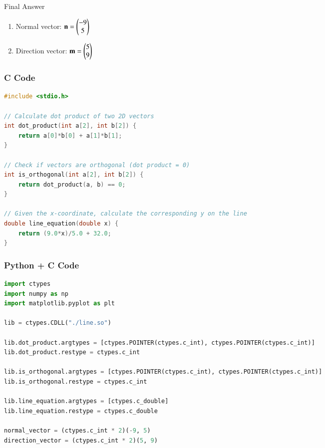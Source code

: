 \documentclass{beamer}
\begin{document}
\begin{frame}{Final Answer}
\begin{enumerate}
    \item Normal vector: $\mathbf{n} = \begin{pmatrix}-9 \\ 5\end{pmatrix}$
    \item Direction vector: $\mathbf{m} = \begin{pmatrix}5 \\ 9\end{pmatrix}$
\end{enumerate}
\end{frame}

\begin{frame}[fragile]
    \frametitle{C Code }

    \begin{lstlisting}[language=C]
#include <stdio.h>

// Calculate dot product of two 2D vectors
int dot_product(int a[2], int b[2]) {
    return a[0]*b[0] + a[1]*b[1];
}

// Check if vectors are orthogonal (dot product = 0)
int is_orthogonal(int a[2], int b[2]) {
    return dot_product(a, b) == 0;
}

// Given the x-coordinate, calculate the corresponding y on the line
double line_equation(double x) {
    return (9.0*x)/5.0 + 32.0;
}
    \end{lstlisting}
\end{frame}

\begin{frame}[fragile]
    \frametitle{Python + C Code }

    \begin{lstlisting}[language=Python]
import ctypes
import numpy as np
import matplotlib.pyplot as plt

lib = ctypes.CDLL("./line.so")

lib.dot_product.argtypes = [ctypes.POINTER(ctypes.c_int), ctypes.POINTER(ctypes.c_int)]
lib.dot_product.restype = ctypes.c_int

lib.is_orthogonal.argtypes = [ctypes.POINTER(ctypes.c_int), ctypes.POINTER(ctypes.c_int)]
lib.is_orthogonal.restype = ctypes.c_int

lib.line_equation.argtypes = [ctypes.c_double]
lib.line_equation.restype = ctypes.c_double

normal_vector = (ctypes.c_int * 2)(-9, 5)
direction_vector = (ctypes.c_int * 2)(5, 9)
    \end{lstlisting}
\end{frame}
\end{document}
